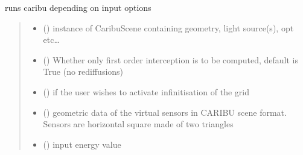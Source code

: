 \documentclass[letterpaper,10pt,english]{sphinxmanual}
\begin{document}
\begin{fulllineitems}
\label{\detokenize{reference:CARIBUinputs.run_caribu}}
\pysigstartsignatures
{}
\pysigstopsignatures
\sphinxAtStartPar
runs caribu depending on input options
\begin{quote}\begin{description}
\begin{itemize}
\item {} 
\sphinxAtStartPar
{} () \textendash{} instance of CaribuScene containing geometry, light source(s), opt etc…

\item {} 
\sphinxAtStartPar
{} () \textendash{} Whether only first order interception is to be computed, default is True (no rediffusions)

\item {} 
\sphinxAtStartPar
{} () \textendash{} if the user wishes to activate infinitisation of the grid

\item {} 
\sphinxAtStartPar
{} () \textendash{} 
\sphinxAtStartPar
geometric data of the virtual sensors in CARIBU scene format. Sensors are horizontal square made of two triangles

\begin{sphinxVerbatim}[commandchars=\\\{\}]
     \PYG{p}{[} \PYG{p}{]} 
\end{sphinxVerbatim}


\item {} 
\sphinxAtStartPar
{} (\sphinxstyleliteralemphasis{\sphinxupquote{, }}) \textendash{} input energy value


\end{itemize}
\end{description}
\end{quote}
\end{fulllineitems}
\end{document}
